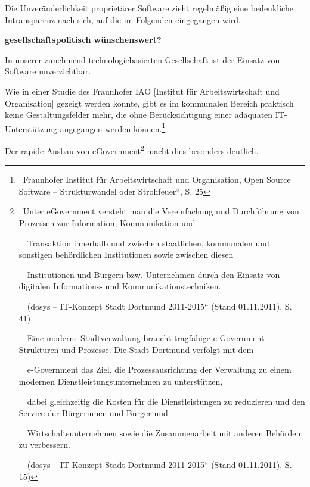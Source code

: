 \documentclass[a4paper]{article}
\begin{document}
\bigskip

{
Die Unver\"anderlichkeit propriet\"arer Software zieht regelm\"a{\ss}ig
eine bedenkliche Intransparenz nach sich, auf die im Folgenden
eingegangen wird.}


{
\textbf{gesellschaftspolitisch}\textbf{ }\textbf{w\"unschenswert?}}


\bigskip


\bigskip

{
In unserer zunehmend technologiebasierten Gesellschaft ist der Einsatz
von Software unverzichtbar.}

{
{\guillemotright}Wie in einer Studie des Fraunhofer IAO [Institut f\"ur
Arbeitswirtschaft und Organisation] gezeigt werden konnte, gibt es im
kommunalen Bereich praktisch keine Gestaltungsfelder mehr, die ohne
Ber\"ucksichtigung einer ad\"aquaten IT-Unterst\"utzung angegangen
werden k\"onnen.{\guillemotleft}\footnote{\ Fraunhofer Institut f\"ur
Arbeitswirtschaft und Organisation, {\quotedblbase}Open Source Software
-- Strukturwandel oder Strohfeuer{\textquotedblleft}, S. 25}}

{
Der rapide Ausbau von eGovernment\footnote{\ {\guillemotright}Unter
eGovernment versteht man die Vereinfachung und Durchf\"uhrung von
Prozessen zur Information, Kommunikation und\par \ \ Transaktion
innerhalb und zwischen staatlichen, kommunalen und sonstigen
beh\"ordlichen Institutionen sowie zwischen diesen\par
\ \ Institutionen und B\"urgern bzw. Unternehmen durch den Einsatz von
digitalen Informations- und
Kommunikationstechniken.{\guillemotleft}\par \ \ (dosys --
{\quotedblbase}IT-Konzept Stadt Dortmund 2011-2015{\textquotedblleft}
(Stand 01.11.2011), S. 41)\par \ \ {\guillemotright}Eine moderne
Stadtverwaltung braucht tragf\"ahige e-Government-Strukturen und
Prozesse. Die Stadt Dortmund verfolgt mit dem\par \ \ e-Government das
Ziel, die Prozessausrichtung der Verwaltung zu einem modernen
Dienstleistungsunternehmen zu unterst\"utzen,\par \ \ dabei
gleichzeitig die Kosten f\"ur die Dienstleistungen zu reduzieren und
den Service der B\"urgerinnen und B\"urger und\par
\ \ Wirtschaftsunternehmen sowie die Zusammenarbeit mit anderen
Beh\"orden zu verbessern.{\guillemotleft}\par \ \ (dosys --
{\quotedblbase}IT-Konzept Stadt Dortmund 2011-2015{\textquotedblleft}
(Stand 01.11.2011), S. 15)} macht dies besonders deutlich.}
\end{document}

